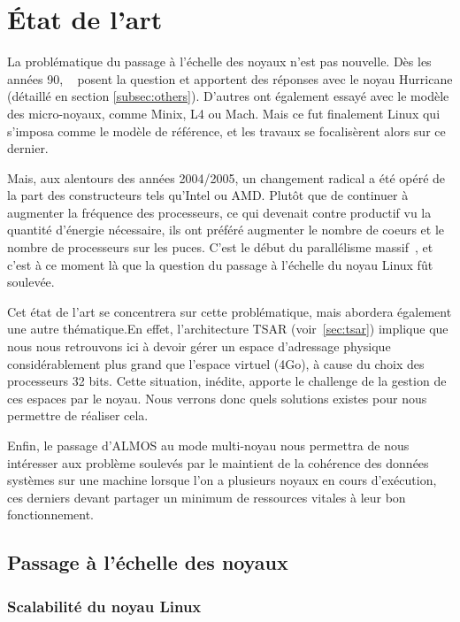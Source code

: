 \chapter{État de l’art}

  La problématique du passage à l’échelle des noyaux n’est pas nouvelle. Dès les
  années 90, ~\citeauthor{unrau1995hierarchical} posent la question et apportent
  des réponses avec le noyau Hurricane (détaillé en section
  \ref{subsec:others}). D’autres ont également essayé avec le modèle des
  micro-noyaux, comme Minix, L4 ou Mach. Mais ce fut finalement Linux qui
  s’imposa comme le modèle de référence, et les travaux se focalisèrent alors
  sur ce dernier.

  Mais, aux alentours des années 2004/2005, un changement radical a été opéré de
  la part des constructeurs tels qu’Intel ou AMD. Plutôt que de continuer à
  augmenter la fréquence des processeurs, ce qui devenait contre productif vu la
  quantité d’énergie nécessaire, ils ont préféré augmenter le nombre de coeurs
  et le nombre de processeurs sur les puces. C'est le début du parallélisme
  massif~\citep{patterson2011parallel}, et c'est à ce moment là que la question
  du passage à l’échelle du noyau Linux fût soulevée.

  Cet état de l'art se concentrera sur cette problématique, mais abordera
  également une autre thématique.En effet, l'architecture TSAR
  (voir~\ref{sec:tsar}) implique que nous nous retrouvons ici à devoir gérer un
  espace d'adressage physique considérablement plus grand que l'espace virtuel
  (4Go), à cause du choix des processeurs 32 bits. Cette situation, inédite,
  apporte le challenge de la gestion de ces espaces par le noyau. Nous verrons
  donc quels solutions existes pour nous permettre de réaliser cela.
  
  Enfin, le passage d’ALMOS au mode multi-noyau nous permettra de nous
  intéresser aux problème soulevés par le maintient de la cohérence des données
  systèmes sur une machine lorsque l'on a plusieurs noyaux en cours d'exécution,
  ces derniers devant partager un minimum de ressources vitales à leur bon
  fonctionnement.

  \section{Passage à l’échelle des noyaux}
  \label{sec:scalability}

    \subsection{Scalabilité du noyau Linux}

